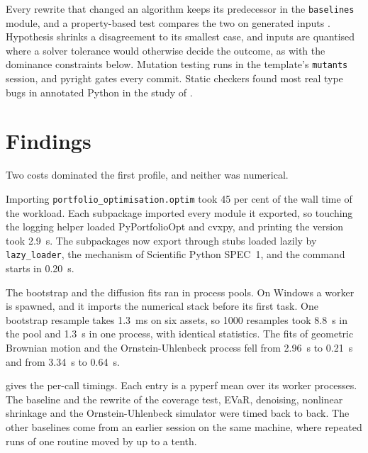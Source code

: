 Every rewrite that changed an algorithm keeps its predecessor in the
\texttt{baselines} module, and a property-based test compares the two on
generated inputs \citep{claessen_quickcheck_2000}. Hypothesis
\citep{maciver_hypothesis_2019} shrinks a disagreement to its smallest case,
and inputs are quantised where a solver tolerance would otherwise decide the
outcome, as with the dominance constraints below. Mutation testing
\citep{jia_analysis_2011} runs in the template's \texttt{mutants} session, and
pyright gates every commit. Static checkers found most real type bugs in
annotated Python in the study of \citet{xu_static_2023}.

\section{Findings}
\label{app:performance:findings}

Two costs dominated the first profile, and neither was numerical.

Importing \texttt{portfolio\_optimisation.optim} took 45 per cent of the wall
time of the workload. Each subpackage imported every module it exported, so
touching the logging helper loaded PyPortfolioOpt and cvxpy, and printing the
version took 2.9~s. The subpackages now export through stubs loaded lazily by
\texttt{lazy\_loader}, the mechanism of Scientific Python SPEC~1, and the
command starts in 0.20~s.

The bootstrap and the diffusion fits ran in process pools. On Windows a
worker is spawned, and it imports the numerical stack before its first task.
One bootstrap resample takes 1.3~ms on six assets, so 1000 resamples took
8.8~s in the pool and 1.3~s in one process, with identical statistics. The
fits of geometric Brownian motion and the Ornstein-Uhlenbeck process fell
from 2.96~s to 0.21~s and from 3.34~s to 0.64~s.

 gives the per-call timings. Each entry is a
pyperf mean over its worker processes. The baseline and the rewrite of the
coverage test, EVaR, denoising, nonlinear shrinkage and the Ornstein-Uhlenbeck
simulator were timed back to back. The other baselines come from an earlier
session on the same machine, where repeated runs of one routine moved by up to
a tenth.

